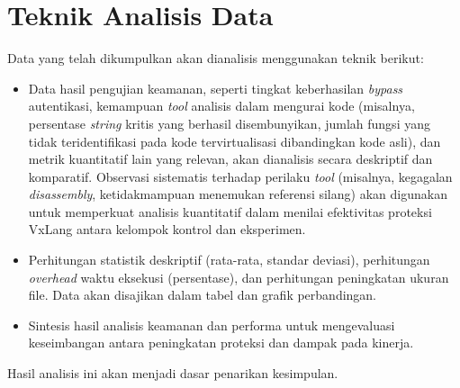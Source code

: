 \section{Teknik Analisis Data}
Data yang telah dikumpulkan akan dianalisis menggunakan teknik berikut:
\begin{itemize}
    \item {} Data hasil pengujian keamanan, seperti tingkat keberhasilan \textit{bypass} autentikasi, kemampuan \textit{tool} analisis dalam mengurai kode (misalnya, persentase \textit{string} kritis yang berhasil disembunyikan, jumlah fungsi yang tidak teridentifikasi pada kode tervirtualisasi dibandingkan kode asli), dan metrik kuantitatif lain yang relevan, akan dianalisis secara deskriptif dan komparatif. Observasi sistematis terhadap perilaku \textit{tool} (misalnya, kegagalan \textit{disassembly}, ketidakmampuan menemukan referensi silang) akan digunakan untuk memperkuat analisis kuantitatif dalam menilai efektivitas proteksi VxLang antara kelompok kontrol dan eksperimen.
    \item {} Perhitungan statistik deskriptif (rata-rata, standar deviasi), perhitungan \textit{overhead} waktu eksekusi (persentase), dan perhitungan peningkatan ukuran file. Data akan disajikan dalam tabel dan grafik perbandingan.
    \item {} Sintesis hasil analisis keamanan dan performa untuk mengevaluasi keseimbangan antara peningkatan proteksi dan dampak pada kinerja.
\end{itemize}
Hasil analisis ini akan menjadi dasar penarikan kesimpulan.
